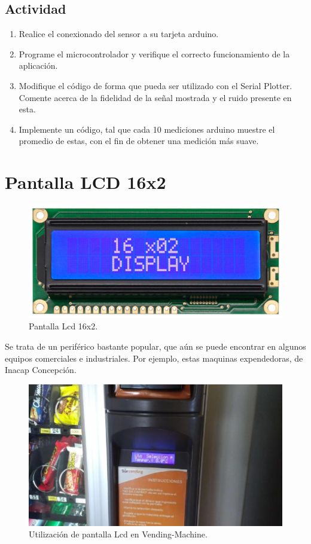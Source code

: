 \documentclass[letterpaper, 10pt]{report}
\begin{document}
\subsection{Actividad}

\begin{enumerate}
	\item Realice el conexionado del sensor a su tarjeta arduino.	
	\item Programe el microcontrolador y verifique el correcto funcionamiento de la aplicación.
	\item Modifique el código de forma que pueda ser utilizado con el Serial Plotter. Comente acerca de la fidelidad de la señal mostrada y el ruido presente en esta.
	\item Implemente un código, tal que cada 10 mediciones arduino muestre el promedio de estas, con el fin de obtener una medición más suave.
\end{enumerate}

\section{Pantalla LCD 16x2}\label{LCD}

\begin{figure}[h]
\centering
\includegraphics[scale=0.3]{lvcd.png}
\caption{Pantalla Lcd 16x2.\label{lcd}}
\end{figure}

Se trata de un periférico bastante popular, que aún se puede encontrar en algunos equipos comerciales e industriales. Por ejemplo, estas maquinas expendedoras, de Inacap Concepción.

\begin{figure}[h]
\centering
\includegraphics[scale=0.5]{lcd_maquina.png}
\caption{Utilización de pantalla Lcd en Vending-Machine.\label{lcd}}
\end{figure}
\end{document}

